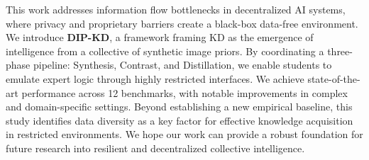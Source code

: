 This work addresses information flow bottlenecks in decentralized AI systems, where privacy and proprietary barriers create a black-box data-free environment.
We introduce \textbf{DIP-KD}, a framework framing KD as the emergence of intelligence from a collective of synthetic image priors.
By coordinating a three-phase pipeline: Synthesis, Contrast, and Distillation, we enable students to emulate expert logic through highly restricted interfaces.
We achieve state-of-the-art performance across 12 benchmarks, with notable improvements in complex and domain-specific settings.
Beyond establishing a new empirical baseline, this study identifies data diversity as a key factor for effective knowledge acquisition in restricted environments.
We hope our work can provide a robust foundation for future research into resilient and decentralized collective intelligence.
